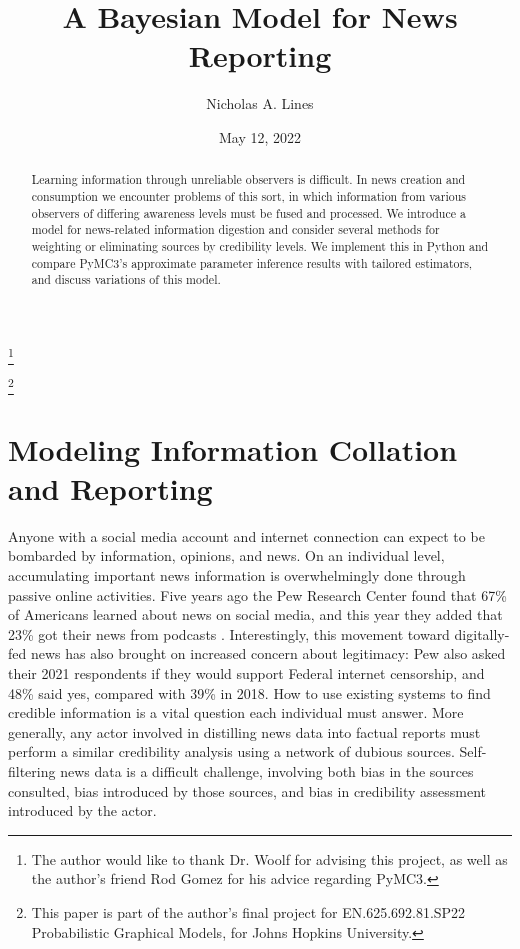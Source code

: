 \documentclass{amsart}
\theoremstyle{plain}
\numberwithin{equation}{section}
\begin{document}
\title[News Reporting]{A Bayesian Model for News Reporting}
\author{Nicholas A. Lines}
\address{}
\thanks{The author would like to thank Dr. Woolf for advising this project,
as well as the author's friend Rod Gomez for his advice regarding PyMC3.}
\date{May 12, 2022}
\thanks{This paper is part of the author's final project for
EN.625.692.81.SP22 Probabilistic Graphical Models, for Johns Hopkins
University.}

\begin{abstract}
Learning information through unreliable observers is difficult. In news
creation and consumption we encounter problems of this sort, in which
information from various observers of differing awareness levels must be
fused and processed. We introduce a model for news-related information
digestion and consider several methods for weighting or eliminating sources
by credibility levels. We implement this in Python and compare PyMC3's
approximate parameter inference results with tailored estimators, and
discuss variations of this model.
\end{abstract}

\maketitle
\tableofcontents
\listoffigures

\newpage

\section{Modeling Information Collation and Reporting}

Anyone with a social media account and internet connection can expect to be
bombarded by information, opinions, and news. On an individual level,
accumulating important news information is overwhelmingly done through
passive online activities. Five years ago the Pew Research Center found that
67\% of Americans learned about news on social media, and this year they
added that 23\% got their news from podcasts \cite{gottfried2019news}\cite%
{walker2022nearly}. Interestingly, this movement toward digitally-fed news
has also brought on increased concern about legitimacy: Pew also asked their
2021 respondents if they would support Federal internet censorship, and 48\%
said yes, compared with 39\% in 2018. How to use existing systems to find
credible information is a vital question each individual must answer. More
generally, any actor involved in distilling news data into factual reports
must perform a similar credibility analysis using a network of dubious
sources. Self-filtering news data is a difficult challenge, involving both
bias in the sources consulted, bias introduced by those sources, and bias in
credibility assessment introduced by the actor.
\end{document}
